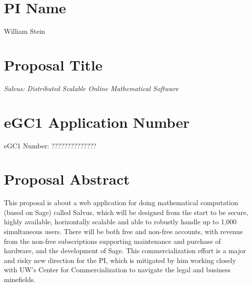 \documentclass[11pt]{article}
\begin{document}
\mbox{}\vspace{4ex}

\section*{PI Name} 
William Stein

\vspace{3ex}
\section*{Proposal Title} 
{\em Salvus: Distributed Scalable Online Mathematical Software}

\vspace{3ex}

\section*{eGC1 Application Number} 
eGC1 Number: ??????????????

\vspace{3ex}

\section*{Proposal Abstract} 
This proposal is about a web application for doing mathematical
computation (based on Sage) called Salvus, which will be designed from
the start to be secure, highly available, horizontally scalable and
able to robustly handle up to 1,000 simultaneous users.  There will be
both free and non-free accounts, with revenue from the non-free
subscriptions supporting maintenance and purchase of hardware, and the
development of Sage.  This commercialization effort is a major and
risky new direction for the PI, which is mitigated by him working
closely with UW's Center for Commercialization to navigate the legal
and business minefields.

\vspace{3ex}
\end{document}
